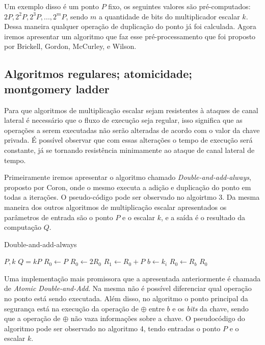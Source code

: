Um exemplo disso é um ponto $P$ fixo, os seguintes valores são pré-computados: $2P, 2^2P, 2^3P,..., 2^mP$, sendo $m$ a quantidade de bits do multiplicador escalar $k$. Dessa maneira qualquer operação de duplicação do ponto já foi calculada. Agora iremos apresentar um algoritmo que faz esse pré-processamento que foi proposto por Brickell, Gordon, McCurley, e Wilson. 

\subsection{Algoritmos regulares; atomicidade; montgomery ladder}
Para que algoritmos de multiplicação escalar sejam resistentes à ataques de canal lateral é necessário que o fluxo de execução seja regular, isso significa que as operações a serem executadas não serão alteradas de acordo com o valor da chave privada. É possível observar que com essas alterações o tempo de execução será constante, já se tornando resistência minimamente ao ataque de canal lateral de tempo.

Primeiramente iremos apresentar o algoritmo chamado \textit{Double-and-add-always}, proposto por Coron, onde o mesmo executa a adição e duplicação do ponto em todas a iterações. O pseudo-código pode ser observado no algoirtmo 3. Da mesma maneira dos outros algoritmos de multiplicação escalar apresentados os parâmetros de entrada são o ponto $P$ e o escalar $k$, e a saída é o resultado da computação $Q$.

\begin{algorithm}[H]
\caption{Double-and-add-always}
\begin{algorithmic} 
    \REQUIRE $P, k$
    \ENSURE $Q = kP$
    \STATE $R_0 \leftarrow P$
        \STATE $R_0 \leftarrow 2R_0$
        \STATE $R_1 \leftarrow R_0 + P$
        \STATE $b \leftarrow k_{i}$
        \STATE $R_0 \leftarrow R_b$
    \ENDFOR
    \RETURN $R_0$
    \end{algorithmic}
\end{algorithm}

Uma implementação mais promissora que a apresentada anteriormente é chamada de \textit{Atomic Double-and-Add}. Na mesma não é possível diferenciar qual operação no ponto está sendo executada. Além disso, no algoritmo o ponto principal da segurança está na execução da operação de $\oplus$ entre $b$ e os \textit{bits} da chave, sendo que a operação de $\oplus$ não vaza informações sobre a chave. O pseudocódigo do algoritmo pode ser observado no algoritmo 4, tendo entradas o ponto $P$ e o escalar $k$.

